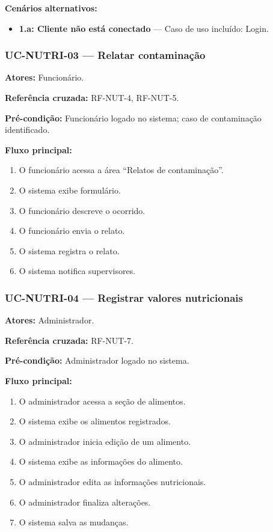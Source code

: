 \documentclass[12pt,a4paper]{article}
\begin{document}
\textbf{Cenários alternativos:}
\begin{itemize}
    \item \textbf{1.a: Cliente não está conectado} — Caso de uso incluído: Login.
\end{itemize}

\subsubsection{UC-NUTRI-03 — Relatar contaminação}
\textbf{Atores:} Funcionário.  

\textbf{Referência cruzada:} RF-NUT-4, RF-NUT-5.  

\textbf{Pré-condição:} Funcionário logado no sistema; caso de contaminação identificado.  

\textbf{Fluxo principal:}
\begin{enumerate}
    \item O funcionário acessa a área “Relatos de contaminação”.
    \item O sistema exibe formulário.
    \item O funcionário descreve o ocorrido.
    \item O funcionário envia o relato.
    \item O sistema registra o relato.
    \item O sistema notifica supervisores.
\end{enumerate}

\subsubsection{UC-NUTRI-04 — Registrar valores nutricionais}
\textbf{Atores:} Administrador.  

\textbf{Referência cruzada:} RF-NUT-7.  

\textbf{Pré-condição:} Administrador logado no sistema.  

\textbf{Fluxo principal:}
\begin{enumerate}
    \item O administrador acessa a seção de alimentos.
    \item O sistema exibe os alimentos registrados.
    \item O administrador inicia edição de um alimento.
    \item O sistema exibe as informações do alimento.
    \item O administrador edita as informações nutricionais.
    \item O administrador finaliza alterações.
    \item O sistema salva as mudanças.
\end{enumerate}
\end{document}
